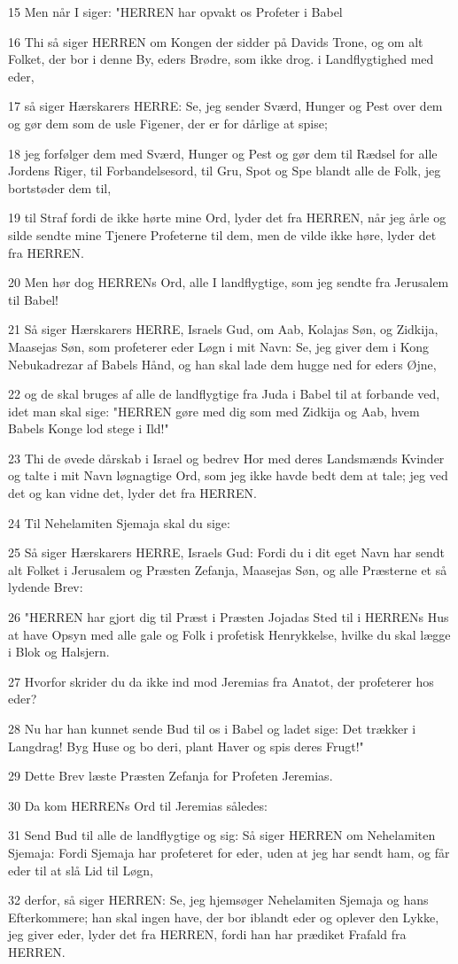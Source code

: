 \par 15 Men når I siger: "HERREN har opvakt os Profeter i Babel
\par 16 Thi så siger HERREN om Kongen der sidder på Davids Trone, og om alt Folket, der bor i denne By, eders Brødre, som ikke drog. i Landflygtighed med eder,
\par 17 så siger Hærskarers HERRE: Se, jeg sender Sværd, Hunger og Pest over dem og gør dem som de usle Figener, der er for dårlige at spise;
\par 18 jeg forfølger dem med Sværd, Hunger og Pest og gør dem til Rædsel for alle Jordens Riger, til Forbandelsesord, til Gru, Spot og Spe blandt alle de Folk, jeg bortstøder dem til,
\par 19 til Straf fordi de ikke hørte mine Ord, lyder det fra HERREN, når jeg årle og silde sendte mine Tjenere Profeterne til dem, men de vilde ikke høre, lyder det fra HERREN.
\par 20 Men hør dog HERRENs Ord, alle I landflygtige, som jeg sendte fra Jerusalem til Babel!
\par 21 Så siger Hærskarers HERRE, Israels Gud, om Aab, Kolajas Søn, og Zidkija, Maasejas Søn, som profeterer eder Løgn i mit Navn: Se, jeg giver dem i Kong Nebukadrezar af Babels Hånd, og han skal lade dem hugge ned for eders Øjne,
\par 22 og de skal bruges af alle de landflygtige fra Juda i Babel til at forbande ved, idet man skal sige: "HERREN gøre med dig som med Zidkija og Aab, hvem Babels Konge lod stege i Ild!"
\par 23 Thi de øvede dårskab i Israel og bedrev Hor med deres Landsmænds Kvinder og talte i mit Navn løgnagtige Ord, som jeg ikke havde bedt dem at tale; jeg ved det og kan vidne det, lyder det fra HERREN.
\par 24 Til Nehelamiten Sjemaja skal du sige:
\par 25 Så siger Hærskarers HERRE, Israels Gud: Fordi du i dit eget Navn har sendt alt Folket i Jerusalem og Præsten Zefanja, Maasejas Søn, og alle Præsterne et så lydende Brev:
\par 26 "HERREN har gjort dig til Præst i Præsten Jojadas Sted til i HERRENs Hus at have Opsyn med alle gale og Folk i profetisk Henrykkelse, hvilke du skal lægge i Blok og Halsjern.
\par 27 Hvorfor skrider du da ikke ind mod Jeremias fra Anatot, der profeterer hos eder?
\par 28 Nu har han kunnet sende Bud til os i Babel og ladet sige: Det trækker i Langdrag! Byg Huse og bo deri, plant Haver og spis deres Frugt!"
\par 29 Dette Brev læste Præsten Zefanja for Profeten Jeremias.
\par 30 Da kom HERRENs Ord til Jeremias således:
\par 31 Send Bud til alle de landflygtige og sig: Så siger HERREN om Nehelamiten Sjemaja: Fordi Sjemaja har profeteret for eder, uden at jeg har sendt ham, og får eder til at slå Lid til Løgn,
\par 32 derfor, så siger HERREN: Se, jeg hjemsøger Nehelamiten Sjemaja og hans Efterkommere; han skal ingen have, der bor iblandt eder og oplever den Lykke, jeg giver eder, lyder det fra HERREN, fordi han har prædiket Frafald fra HERREN.


